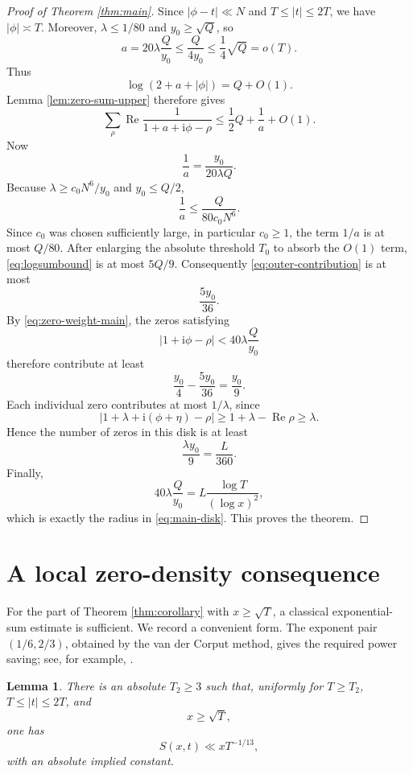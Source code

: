 \documentclass[12pt,reqno]{amsart}
\newtheorem{lemma}[theorem]{Lemma}
\theoremstyle{remark}
\numberwithin{equation}{section}
\newcommand{\Ree}{\operatorname{Re}}
\newcommand{\ii}{\mathrm i}
\begin{document}
\begin{proof}[Proof of Theorem \ref{thm:main}]
Since $|\phi-t|\ll N$ and $T\le|t|\le2T$, we have $|\phi|\asymp T$.  Moreover, $\lambda\le1/80$ and $y_0\ge\sqrt Q$, so
\[
a=20\lambda\frac{Q}{y_0}\le\frac{Q}{4y_0}\le\frac14\sqrt Q=o(T).
\]
Thus
\[
\log(2+a+|\phi|)=Q+O(1).
\]
Lemma \ref{lem:zero-sum-upper} therefore gives
\begin{equation}\label{eq:logsumbound}
\sum_\rho\Ree\frac1{1+a+\ii\phi-\rho}
\le\frac12Q+\frac1a+O(1).
\end{equation}
Now
\[
\frac1a=\frac{y_0}{20\lambda Q}.
\]
Because $\lambda\ge c_0N^6/y_0$ and $y_0\le Q/2$,
\[
\frac1a\le\frac{Q}{80c_0N^6}.
\]
Since $c_0$ was chosen sufficiently large, in particular $c_0\ge1$, the term $1/a$ is at most $Q/80$.  After enlarging the absolute threshold $T_0$ to absorb the $O(1)$ term, \eqref{eq:logsumbound} is at most $5Q/9$.  Consequently \eqref{eq:outer-contribution} is at most
\[
\frac{5y_0}{36}.
\]
By \eqref{eq:zero-weight-main}, the zeros satisfying
\[
|1+\ii\phi-\rho|<40\lambda\frac{Q}{y_0}
\]
therefore contribute at least
\[
\frac{y_0}{4}-\frac{5y_0}{36}=\frac{y_0}{9}.
\]
Each individual zero contributes at most $1/\lambda$, since
\[
|1+\lambda+\ii(\phi+\eta)-\rho|\ge1+\lambda-\Ree\rho\ge\lambda.
\]
Hence the number of zeros in this disk is at least
\[
\frac{\lambda y_0}{9}=\frac{L}{360}.
\]
Finally,
\[
40\lambda\frac{Q}{y_0}
=L\frac{\log T}{(\log x)^2},
\]
which is exactly the radius in \eqref{eq:main-disk}.  This proves the theorem.
\end{proof}

\section{A local zero-density consequence}\label{sec:cor-proof}

For the part of Theorem \ref{thm:corollary} with $x\ge\sqrt T$, a classical exponential-sum estimate is sufficient.  We record a convenient form.  The exponent pair $(1/6,2/3)$, obtained by the van der Corput method, gives the required power saving; see, for example, \cite[Chapter~8, especially Sections~8.3--8.4]{IK}.

\begin{lemma}\label{lem:large-x}
There is an absolute $T_2\ge3$ such that, uniformly for $T\ge T_2$, $T\le|t|\le2T$, and
\[
x\ge\sqrt T,
\]
one has
\begin{equation}\label{eq:large-x-bound}
S(x,t)\ll xT^{-1/13},
\end{equation}
with an absolute implied constant.
\end{lemma}
\end{document}
